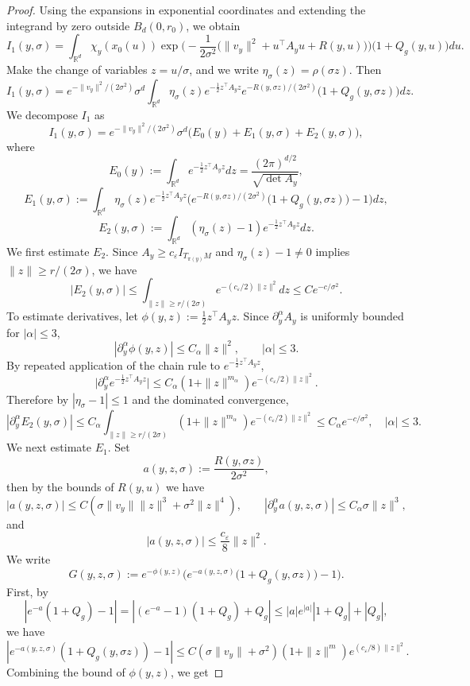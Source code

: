 \documentclass[11pt]{article}
\theoremstyle{plain}
\theoremstyle{definition}
\begin{document}
\begin{proof}
Using the expansions in exponential coordinates and extending the integrand by zero outside $B_d(0,r_0)$, we obtain
\[
I_1(y,\sigma)
=
\int_{\mathbb R^d}
\chi_y(x_0(u))
\exp\big(-\frac{1}{2\sigma^2}\big(\|v_y\|^2 + u^\top A_y u + R(y,u)\big)\big)
\big(1+Q_g(y,u)\big)du.
\]
Make the change of variables $z = u/\sigma$, and we write $\eta_\sigma(z) = \rho(\sigma z)$. Then
\[
I_1(y,\sigma)
=
e^{-\|v_y\|^2/(2\sigma^2)}\sigma^d
\int_{\mathbb R^d}
\eta_\sigma(z)
e^{-\frac12 z^\top A_y z}
e^{-R(y,\sigma z)/(2\sigma^2)}
\big(1+Q_g(y,\sigma z)\big)dz.
\]
We decompose $I_1$ as
\[
I_1(y,\sigma)
=
e^{-\|v_y\|^2/(2\sigma^2)}\sigma^d
\big(E_0(y)+E_1(y,\sigma)+E_2(y,\sigma)\big),
\]
where
\[
E_0(y):=\int_{\mathbb R^d} e^{-\frac12 z^\top A_y z}dz
=\frac{(2\pi)^{d/2}}{\sqrt{\det A_y}},
\]
\[
E_1(y,\sigma)
:=
\int_{\mathbb R^d}
\eta_\sigma(z)e^{-\frac12 z^\top A_y z}
\big(
e^{-R(y,\sigma z)/(2\sigma^2)}\big(1+Q_g(y,\sigma z)\big)-1
\big)dz,
\]
\[
E_2(y,\sigma)
:=
\int_{\mathbb R^d}
(\eta_\sigma(z)-1)e^{-\frac12 z^\top A_y z}dz.
\]
We first estimate $E_2$. 
Since $A_y\ge c_\varepsilon I_{T_{\pi(y)}M}$ and $\eta_\sigma(z)-1\neq 0$ implies $\|z\|\ge r/(2\sigma)$, we have
\[
|E_2(y,\sigma)|
\le
\int_{\|z\|\ge r/(2\sigma)} e^{-(c_\varepsilon/2)\|z\|^2}dz
\le C e^{-c/\sigma^2}.
\]
To estimate derivatives, let $\phi(y,z):=\frac12 z^\top A_y z$. Since $\partial_y^\alpha A_y$ is uniformly bounded for $|\alpha|\le 3$,
\[
|\partial_y^\alpha \phi(y,z)|\le C_\alpha \|z\|^2, \qquad |\alpha|\le 3.
\]
By repeated application of the chain rule to $e^{-\frac12 z^\top A_y z}$,
\[
\Big|
\partial_y^\alpha e^{-\frac12 z^\top A_y z}
\Big|
\le
C_\alpha (1+\|z\|^{m_\alpha})e^{-(c_\varepsilon/2)\|z\|^2}.
\]
Therefore by $|\eta_\sigma-1|\le1$ and the dominated convergence,
\[
|\partial_y^\alpha E_2(y,\sigma)|
\le
C_\alpha\int_{\|z\|\ge r/(2\sigma)} (1+\|z\|^{m_\alpha})e^{-(c_\varepsilon/2)\|z\|^2}
\le
C_\alpha e^{-c/\sigma^2},
\quad |\alpha|\le 3.
\]
We next estimate $E_1$. Set
\[
a(y,z,\sigma):=\frac{R(y,\sigma z)}{2\sigma^2},
\]
then by the bounds of $R(y, u)$ we have 
\[
|a(y,z,\sigma)|\le C(\sigma\|v_y\|\|z\|^3+\sigma^2\|z\|^4),
\qquad
|\partial_y^\alpha a(y,z,\sigma)|\le C_\alpha\sigma\|z\|^3,
\]
and
\[
|a(y,z,\sigma)| \le \frac{c_\varepsilon}{8}\|z\|^2.
\]
We write
\[
G(y,z,\sigma):=
e^{-\phi(y,z)}
\big(
e^{-a(y,z,\sigma)}\big(1+Q_g(y,\sigma z)\big)-1
\big).
\]
First, by 
\[
|e^{-a}(1+Q_g)-1| = |(e^{-a}-1)(1+Q_g)+Q_g|\le|a|e^{|a|}|1+Q_g|+|Q_g|,
\]
we have 
\[
|e^{-a(y,z,\sigma)}(1+Q_g(y,\sigma z))-1| \le C(\sigma\|v_y\|+\sigma^2)(1+\|z\|^m)e^{(c_\varepsilon/8)\|z\|^2}.
\]
Combining the bound of $\phi(y,z)$, we get

\end{proof}
\end{document}

